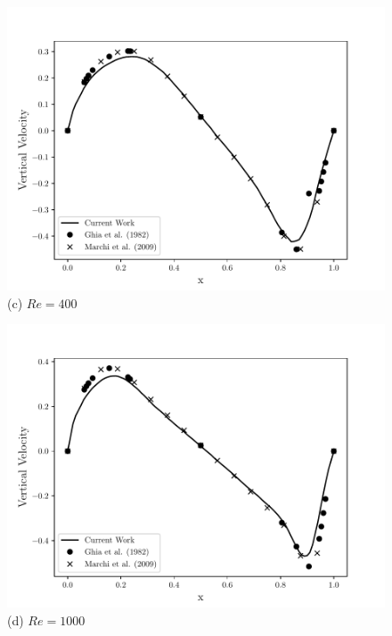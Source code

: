 \begin{figure}[H]
     \begin{minipage}{.5\linewidth}
      \centering
      \includegraphics[scale=0.53]{./02_chaps/cap_validation/figure/Re_400_v_profile.pdf}\\
      (c) $Re=400$
     \end{minipage}%
     \begin{minipage}{.5\linewidth}
      \centering
      \includegraphics[scale=0.53]{./02_chaps/cap_validation/figure/Re_1000_v_profile.pdf}\\
      (d) $Re=1000$
     \end{minipage}
     \medskip
     \label{velocity vy cavity}
\end{figure}

